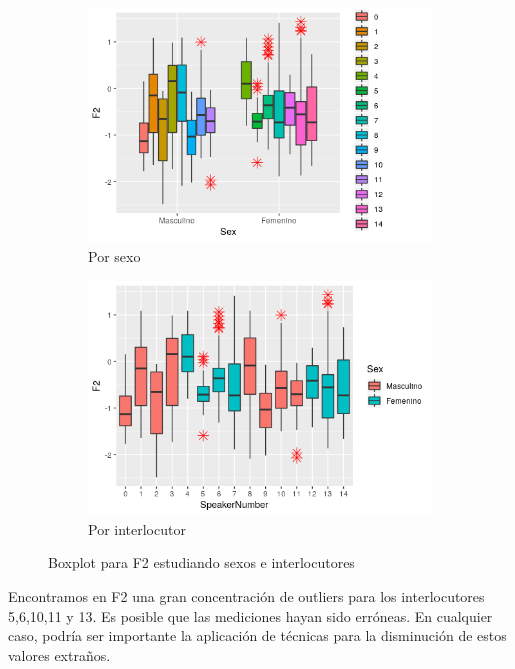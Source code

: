 \begin{figure}[H]
	\centering
	\begin{subfigure}{.5\textwidth}
		\centering
		\includegraphics[width=.9\linewidth]{bps2.png}
		\caption{Por sexo}
		\label{fig:bps2}
	\end{subfigure}%
	\begin{subfigure}{.5\textwidth}
		\centering
		\includegraphics[width=.9\linewidth]{bpsn2.png}
		\caption{Por interlocutor}
		\label{fig:bpsn2}
	\end{subfigure}
	\caption{Boxplot para F2 estudiando sexos e interlocutores}
	\label{fig:bf2}
\end{figure}

Encontramos en F2 una gran concentración de outliers para los interlocutores 5,6,10,11 y 13. Es posible que las mediciones hayan sido erróneas. En cualquier caso, podría ser importante la aplicación de técnicas para la disminución de estos valores extraños. \\

